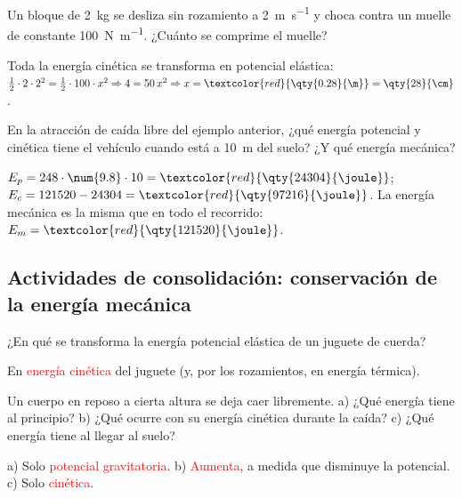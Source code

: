 \begin{exercise}
    Un bloque de \qty{2}{\kg} se desliza sin rozamiento a \qty{2}{\m\per\s} y choca contra un muelle de constante \qty{100}{\newton\per\m}. ¿Cuánto se comprime el muelle?
    \begin{solu}
        Toda la energía cinética se transforma en potencial elástica:
        \(\frac{1}{2} \cdot 2 \cdot 2^2 = \frac{1}{2} \cdot 100 \cdot x^2 \Rightarrow 4 = 50 \, x^2 \Rightarrow x = \textcolor{red}{\qty{0.28}{\m}} = \qty{28}{\cm}\).
    \end{solu}
\end{exercise}

\begin{exercise}
    En la atracción de caída libre del ejemplo anterior, ¿qué energía potencial y cinética tiene el vehículo cuando está a \qty{10}{\m} del suelo? ¿Y qué energía mecánica?
    \begin{solu}
        \(E_p = 248 \cdot \num{9.8} \cdot 10 = \textcolor{red}{\qty{24304}{\joule}}\); \(E_c = 121520 - 24304 = \textcolor{red}{\qty{97216}{\joule}}\). La energía mecánica es la misma que en todo el recorrido: \(E_m = \textcolor{red}{\qty{121520}{\joule}}\).
    \end{solu}
\end{exercise}

\subsection*{Actividades de consolidación: conservación de la energía mecánica}

\begin{exercise}
    ¿En qué se transforma la energía potencial elástica de un juguete de cuerda?
    \begin{solu}
        En \textcolor{red}{energía cinética} del juguete (y, por los rozamientos, en energía térmica).
    \end{solu}
\end{exercise}

\begin{exercise}
    Un cuerpo en reposo a cierta altura se deja caer libremente. a) ¿Qué energía tiene al principio? b) ¿Qué ocurre con su energía cinética durante la caída? c) ¿Qué energía tiene al llegar al suelo?
    \begin{solu}
        a) Solo \textcolor{red}{potencial gravitatoria}. b) \textcolor{red}{Aumenta}, a medida que disminuye la potencial. c) Solo \textcolor{red}{cinética}.
    \end{solu}
\end{exercise}

